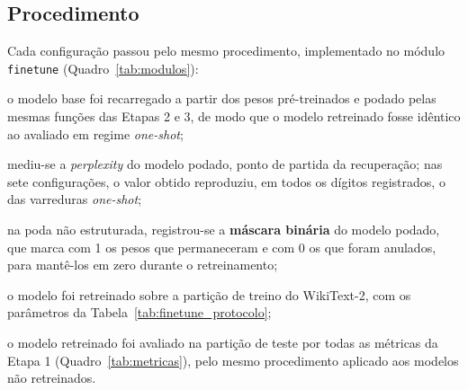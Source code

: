 \subsection{Procedimento}\label{subsec:ft_procedimento}

Cada configuração passou pelo mesmo procedimento, implementado no módulo
\texttt{finetune} (Quadro~\ref{tab:modulos}):

\begin{alineas}
    \item o modelo base foi recarregado a partir dos pesos pré-treinados e podado
          pelas mesmas funções das Etapas 2 e 3, de modo que o modelo retreinado fosse
          idêntico ao avaliado em regime \textit{one-shot};
    \item mediu-se a \textit{perplexity} do modelo podado, ponto de partida da
          recuperação; nas sete configurações, o valor obtido reproduziu, em todos os
          dígitos registrados, o das varreduras \textit{one-shot};
    \item na poda não estruturada, registrou-se a \textbf{máscara binária} do modelo
          podado, que marca com 1 os pesos que permaneceram e com 0 os que foram anulados,
          para mantê-los em zero durante o retreinamento;
    \item o modelo foi retreinado sobre a partição de treino do WikiText-2, com os
          parâmetros da Tabela~\ref{tab:finetune_protocolo};
    \item o modelo retreinado foi avaliado na partição de teste por todas as métricas da
          Etapa 1 (Quadro~\ref{tab:metricas}), pelo mesmo procedimento aplicado aos
          modelos não retreinados.
\end{alineas}

